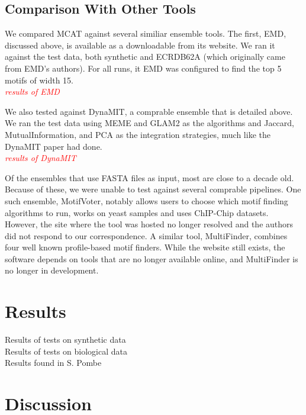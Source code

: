 \documentclass[12pt]{article}
\newenvironment{SLOPPY}{\begin{sloppypar}\hbadness=10000}{\end{sloppypar}}
\newcommand{\comment}[1]{\textcolor{red}{\it{#1}}}
\begin{document}
\subsection{Comparison With Other Tools}
\begin{SLOPPY}
\indent

We compared MCAT against several similiar ensemble tools. The first, EMD, discussed above, is available as a downloadable
from its website. We ran it against the test data, both synthetic and ECRDB62A (which originally came from EMD's authors). For all runs, it EMD
was configured to find the top 5 motifs of width 15. \\
\comment {results of EMD}

We also tested against DynaMIT, a comprable ensemble that is detailed above. We ran the test data using MEME and GLAM2 as the algorithms and Jaccard, MutualInformation, and PCA as the integration strategies, much like the DynaMIT paper had done.\\ 
\comment {results of DynaMIT}

Of the ensembles that use FASTA files as input, most are close to a decade old. Because of these, we were unable
to test against several comprable pipelines. One such ensemble, MotifVoter, notably allows users to choose
which motif finding algorithms to run, works on yeast samples and uses ChIP-Chip datasets. However, the site where 
the tool was hosted no longer resolved and the authors did not respond to our correspondence. 
A similar tool, MultiFinder, combines four well known profile-based motif finders. While the website 
still exists, the software depends on tools that are no longer available online, and 
MultiFinder is no longer in development. \\

\end{SLOPPY}

\section{Results}
\label{section:results}

\begin{SLOPPY}
Results of tests on synthetic data\\
Results of tests on biological data\\
Results found in S. Pombe\\
\end{SLOPPY}

\section{Discussion}
\label{section:discussion}
\end{document}
